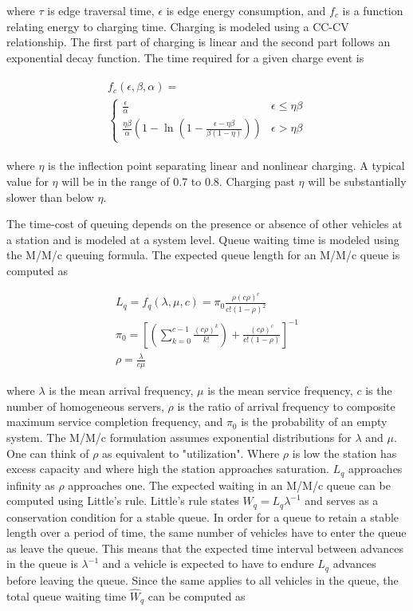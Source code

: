 where $\tau$ is edge traversal time, $\epsilon$ is edge energy consumption, and $f_c$ is a function relating energy to charging time. Charging is modeled using a CC-CV relationship. The first part of charging is linear and the second part follows an exponential decay function. The time required for a given charge event is

\begin{gather}
	\begin{gathered}
	f_{c}(\epsilon, \beta, \alpha) = \\\begin{cases}
		\frac{\epsilon}{\alpha} & \epsilon \leq \eta\beta \\
		\frac{\eta\beta}{\alpha}\left(1-\ln{\left(1-\frac{\epsilon - \eta\beta}{\beta(1-\eta)}\right)}\right) &  \epsilon > \eta\beta
	\end{cases}
	\end{gathered}
\end{gather}

where $\eta$ is the inflection point separating linear and nonlinear charging. A typical value for $\eta$ will be in the range of 0.7 to 0.8. Charging past $\eta$ will be substantially slower than below $\eta$.

The time-cost of queuing depends on the presence or absence of other vehicles at a station and is modeled at a system level. Queue waiting time is modeled using the M/M/c queuing formula. The expected queue length for an M/M/c queue is computed as

\begin{gather}
	L_q = f_{q}(\lambda, \mu, c) = \pi_0\frac{\rho(c\rho)^c}{c!(1-\rho)^2}\label{eq:w_q}\\
	\pi_0=\left[\left(\sum_{k = 0}^{c - 1}\frac{(c\rho)^k}{k!}\right) + \frac{(c\rho)^c}{c!(1 - \rho)}\right]^{-1}\\
	\rho = \frac{\lambda}{c\mu}
\end{gather}

where $\lambda$ is the mean arrival frequency, $\mu$ is the mean service frequency, $c$ is the number of homogeneous servers, $\rho$ is the ratio of arrival frequency to composite maximum service completion frequency, and $\pi_0$ is the probability of an empty system. The M/M/c formulation assumes exponential distributions for $\lambda$ and $\mu$. One can think of $\rho$ as equivalent to "utilization". Where $\rho$ is low the station has excess capacity and where high the station approaches saturation. $L_q$ approaches infinity as $\rho$ approaches one. The expected waiting in an M/M/c queue can be computed using Little's rule. Little's rule states $W_q = L_q\lambda^{-1}$ and serves as a conservation condition for a stable queue. In order for a queue to retain a stable length over a period of time, the same number of vehicles have to enter the queue as leave the queue. This means that the expected time interval between advances in the queue is $\lambda^{-1}$ and a vehicle is expected to have to endure $L_q$ advances before leaving the queue. Since the same applies to all vehicles in the queue, the total queue waiting time $\hat{W}_q$ can be computed as

